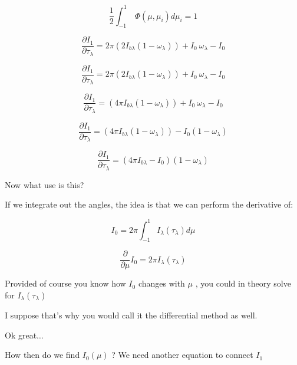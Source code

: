 \documentclass[12pt]{article}
\renewcommand{\_}{\kern-1.5pt\textunderscore\kern-1.5pt}
\begin{document}
\begin{itemize}
 \[ \frac{1}{2} \int _{-1}^{1}~ \Phi  \left(  \mu , \mu _{i} \right) d \mu _{i}=1 \] \par

 \[ \frac{ \partial I_{1}}{ \partial  \tau_{ \lambda }}=2 \pi  \left( 2I_{b \lambda } \left( 1- \omega _{ \lambda } \right)  \right) +I_{0}~ \omega _{ \lambda } -I_{0} \] \par

 \[ \frac{ \partial I_{1}}{ \partial  \tau_{ \lambda }}=2 \pi  \left( 2I_{b \lambda } \left( 1- \omega _{ \lambda } \right)  \right) +I_{0}~ \omega _{ \lambda } -I_{0} \] \par

 \[ \frac{ \partial I_{1}}{ \partial  \tau_{ \lambda }}= \left( 4 \pi I_{b \lambda } \left( 1- \omega _{ \lambda } \right)  \right) +I_{0}~ \omega _{ \lambda } -I_{0} \] \par

 \[ \frac{ \partial I_{1}}{ \partial  \tau_{ \lambda }}= \left( 4 \pi I_{b \lambda } \left( 1- \omega _{ \lambda } \right)  \right) -I_{0} \left( 1- \omega _{ \lambda } \right)  \] \par

 \[ \frac{ \partial I_{1}}{ \partial  \tau_{ \lambda }}= \left( 4 \pi I_{b \lambda }-I_{0} \right)  \left( 1- \omega _{ \lambda } \right)  \] \par

Now what use is this?\par

If we integrate out the angles, the idea is that we can perform the derivative of:\par

 \[ I_{0}=2 \pi  \int _{-1}^{1}I_{ \lambda } \left(  \tau_{ \lambda } \right) d \mu  \] \par

 \[ \frac{ \partial }{ \partial  \mu }I_{0}=2 \pi  I_{ \lambda } \left(  \tau_{ \lambda } \right)  \] \par

Provided of course you know how  \( I_{0} \)  changes with  \(  \mu  \) , you could in theory solve for  \( I_{ \lambda } \left(  \tau_{ \lambda } \right)  \) \par

I suppose that’s why you would call it the differential method as well.\par

Ok great$ \ldots $ \par

How then do we find  \( I_{0} \left(  \mu  \right)  \) ? We need another equation to connect  \( I_{1} \) \par


\end{itemize}
\end{document}
